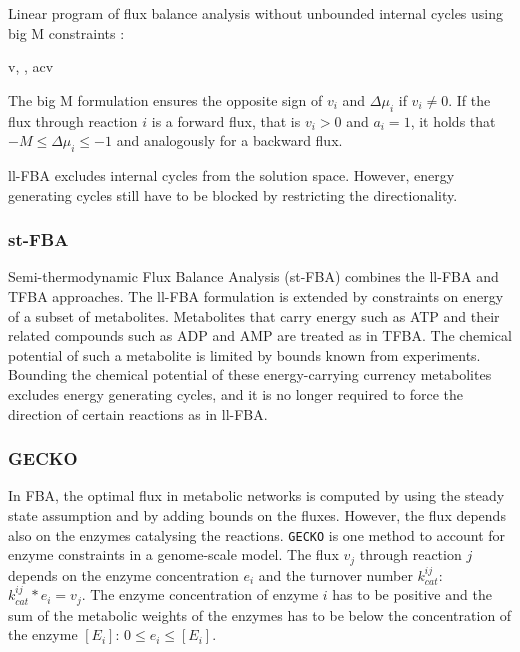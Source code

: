 Linear program of flux balance analysis without unbounded internal cycles using big M constraints \cite{elimination_infeasible_loops}:

\begin{maxi!}
    {\scriptstyle v, \Delta \mu, a}{c\tran v}{ \label{Eq:thermo_fba_bigM}}{}
\end{maxi!}
The big M formulation ensures the opposite sign of $v_i$ and $\Delta \mu_i$ if $v_i \neq 0$. If the flux through reaction $i$ is a forward flux, that is $v_i > 0$ and $a_i=1$, it holds that $-M \leq \Delta \mu_i \leq -1$ and analogously for a backward flux.


ll-FBA excludes internal cycles from the solution space. However, energy generating cycles still have to be blocked by restricting the directionality.

\subsubsection{st-FBA}
Semi-thermodynamic Flux Balance Analysis (st-FBA) combines the ll-FBA and TFBA approaches. The ll-FBA formulation is extended by constraints on energy of a subset of metabolites. Metabolites that carry energy such as ATP and their related compounds such as ADP and AMP are treated as in TFBA. The chemical potential of such a metabolite is limited by bounds known from experiments. Bounding the chemical potential of these energy-carrying currency metabolites excludes energy generating cycles, and it is no longer required to force the direction of certain reactions as in ll-FBA.
\cite{noor_removing_2018}


\subsubsection{GECKO}
In FBA, the optimal flux in metabolic networks is computed by using the steady state assumption and by adding bounds on the fluxes. However, the flux depends also on the enzymes catalysing the reactions.
\texttt{GECKO} is one method to account for enzyme constraints in a genome-scale model. The flux $v_j$ through reaction $j$ depends on the enzyme concentration $e_i$ and the turnover number  $k_{cat}^{ij}$: $k_{cat}^{ij} * e_i = v_j$. 
The enzyme concentration of enzyme $i$ has to be positive and the sum of the metabolic weights of the enzymes has to be below the concentration of the enzyme $[E_i]$: $0 \leq e_i \leq [E_i]$. 

